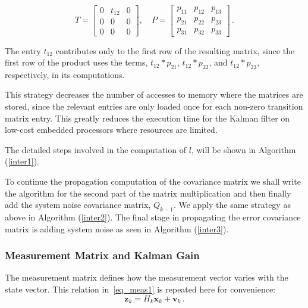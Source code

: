 \documentclass[journal]{IEEEtran}
\begin{document}
\begin{equation}
 T=   \begin{bmatrix}
    0 & t_{12}& 0\\
    0 & 0    & 0 \\
    0 & 0    & 0
\end{bmatrix},\quad  P=   \begin{bmatrix}
    p_{11} & p_{12} & p_{13}\\
    p_{21} & p_{22} & p_{23} \\
    p_{31} & p_{32} &p_{33}
\end{bmatrix}\,.
\end{equation}

The entry $t_{12}$ contributes only to the first row of the resulting matrix, since the first row of the product  uses  the terms, $t_{12}*p_{21}$, $t_{12}*p_{22}$, and $t_{12}*p_{23}$, respectively, in its computations.\par
This strategy decreases the number of  accesses to  memory where the matrices are stored, since the relevant entries are only loaded once for each non-zero transition matrix entry. This greatly reduces the execution time for the Kalman filter on low-cost embedded processors where resources are limited.\par
The detailed steps involved in the computation of $l$, will be shown in Algorithm (\ref{inter1}).\par

To continue the propagation computation of the covariance matrix we shall write the algorithm for  the second part of the matrix multiplication and then finally add the system noise covariance matrix, $Q_{k-1}$. We apply the same strategy as above in Algorithm (\ref{inter2}). The final stage in propagating the error covariance matrix is adding system noise as seen in Algorithm (\ref{inter3}).



%
\subsubsection{Measurement Matrix and Kalman Gain}
The measurement matrix defines how the measurement vector varies with the state vector. This relation in~\eqref{eq_meas1} is repeated here for convenience:
\begin{equation}
\label{eq_meas2}
    \boldsymbol{z}_k= H_k\boldsymbol{x}_k+\boldsymbol{v}_k\,.
\end{equation}
\end{document}
